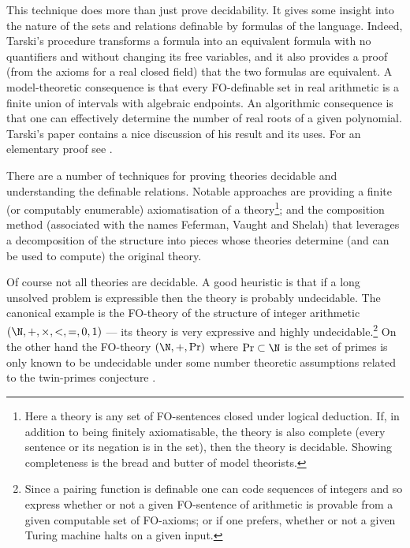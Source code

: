 This technique does more than just prove decidability. It gives
some insight into the nature of the sets and relations definable by
formulas of the language.  Indeed, Tarski's procedure transforms a
formula into an equivalent formula with no quantifiers and without changing its
free variables, and it also provides a proof (from the axioms for a real closed field) that the two formulas are equivalent. 
A model-theoretic consequence is that every FO-definable set in real arithmetic is a finite union of intervals with algebraic endpoints. An algorithmic consequence
is that one can effectively determine the number of real roots of a given polynomial.
Tarski's paper \cite{Tars51} contains a nice discussion of his result
and its uses. For an elementary proof see \cite{MiOz02}.

There are a number of techniques for proving theories decidable and understanding the definable relations. Notable approaches
are providing a finite (or computably enumerable) axiomatisation of a theory\footnote{Here a theory is any set of FO-sentences closed under logical deduction. If, in addition to being finitely axiomatisable, the theory is also complete (every sentence or its negation is in the set), then the theory is decidable. Showing completeness is the bread and butter of model theorists.}; and  the composition method
(associated with the names Feferman, Vaught and Shelah) that leverages a decomposition of the structure into pieces whose theories determine (and can be used to compute) the original theory.

Of course not all theories are decidable. A good heuristic is that if a long unsolved problem is expressible then the theory is probably undecidable. 
The canonical example is the FO-theory of the structure of integer arithmetic $(\N,+,\times,<,=,0,1)$ --- its theory is very expressive and highly undecidable.\footnote{Since a pairing function is definable one can code sequences of integers and so express whether or not a given FO-sentence of arithmetic is provable from a given computable set of FO-axioms; or if one prefers, whether or not a given Turing machine halts on a given input.}
On the other hand the FO-theory $(\N,+,\text{Pr})$ where $\text{Pr} \subset \N$ is the set of primes is only known to be undecidable
under some number theoretic assumptions related to the twin-primes conjecture \cite{BJW93}.

%

